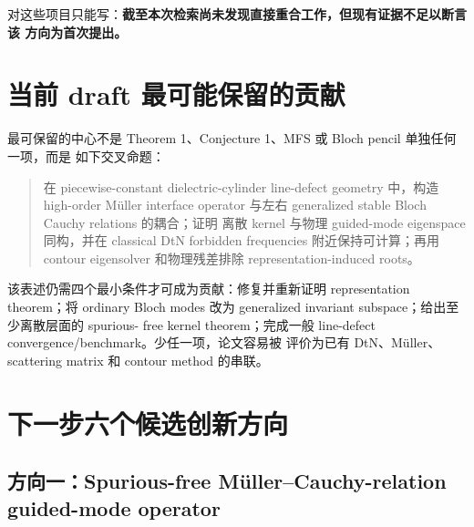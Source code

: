 \documentclass[UTF8,11pt,fontset=none]{ctexart}
\begin{document}
对这些项目只能写：\textbf{截至本次检索尚未发现直接重合工作，但现有证据不足以断言该
方向为首次提出。}

\section{当前 draft 最可能保留的贡献}

最可保留的中心不是 Theorem 1、Conjecture 1、MFS 或 Bloch pencil 单独任何一项，而是
如下交叉命题：

\begin{quote}
在 piecewise-constant dielectric-cylinder line-defect geometry 中，构造 high-order
Müller interface operator 与左右 generalized stable Bloch Cauchy relations 的耦合；证明
离散 kernel 与物理 guided-mode eigenspace 同构，并在 classical DtN forbidden frequencies
附近保持可计算；再用 contour eigensolver 和物理残差排除 representation-induced roots。
\end{quote}

该表述仍需四个最小条件才可成为贡献：修复并重新证明 representation theorem；将
ordinary Bloch modes 改为 generalized invariant subspace；给出至少离散层面的 spurious-
free kernel theorem；完成一般 line-defect convergence/benchmark。少任一项，论文容易被
评价为已有 DtN、Müller、scattering matrix 和 contour method 的串联。

\section{下一步六个候选创新方向}

\subsection{方向一：Spurious-free Müller--Cauchy-relation guided-mode operator}
\end{document}
